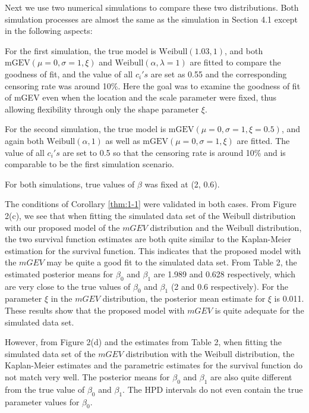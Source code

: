 \documentclass[smallextended]{svjour3}       %
\begin{document}
{Next we use two numerical simulations to compare these two distributions.
Both simulation processes are almost the same as the simulation in
Section 4.1 except in the following aspects:


For the first simulation, the true model is $\mbox{Weibull}(1.03,1)$, and both $\mbox{mGEV}(\mu=0,\sigma=1,\xi)$ and $\mbox{Weibull}(\alpha,\lambda=1)$ are fitted to compare the goodness of fit, and the value of all $c_{i}'s$ are set as 0.55 and the corresponding censoring rate was around 10\%. Here the goal was to examine the goodness of fit of mGEV even when the location and the scale parameter were fixed, thus
allowing flexibility through only the shape parameter $\xi$.


For the second simulation, the true model is $\mbox{mGEV}(\mu=0,\sigma=1,\xi=0.5)$, and again both $\mbox{Weibull}(\alpha,1)$ as
well as $\mbox{mGEV}(\mu=0,\sigma=1,\xi)$ are fitted.
The value of all $c_{i}'s$ are set to 0.5 so that the censoring
rate is around 10\% and is comparable to be the first simulation scenario.  

For both simulations, true values of $\beta$ was fixed at (2, 0.6). 

The conditions of Corollary \ref{thm:1-1} were validated in both cases. From Figure 2(c), we see that when fitting the simulated data set of the Weibull distribution with our proposed model of the $mGEV$ distribution and the Weibull distribution, the two survival function estimates are both quite similar to the Kaplan-Meier estimation for the survival function. This indicates that the proposed model with the $mGEV$ may be quite a good fit to the simulated data set. From Table 2, the estimated posterior means for $\beta_{0}$ and $\beta_{1}$ are 1.989 and 0.628 respectively, which are very close to the true values of $\beta_{0}$ and $\beta_{1}$ (2 and 0.6 respectively). For the parameter $\xi$ in the $mGEV$ distribution, the posterior mean estimate for $\xi$ is 0.011. These results show that the proposed model with $mGEV$ is quite adequate for
the simulated data set.

However, from Figure 2(d) and the estimates from Table 2, when fitting the simulated data set of the $mGEV$ distribution with the Weibull distribution, the Kaplan-Meier estimates and the parametric estimates for the survival function do not match very well. The posterior means for $\beta_{0}$ and $\beta_{1}$ are also quite different from the true value of $\beta_{0}$
and $\beta_{1}$. The HPD intervals do not even contain the true parameter values for $\beta_{0}$.

}
\end{document}
